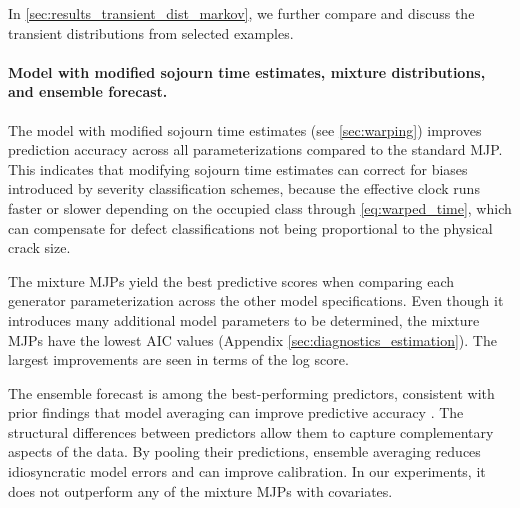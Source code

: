 In \cref{sec:results_transient_dist_markov}, we further compare and discuss the transient distributions from selected examples.



\paragraph{Model with modified sojourn time estimates, mixture distributions, and ensemble forecast.}
The model with modified sojourn time estimates (see \cref{sec:warping}) improves prediction accuracy across all parameterizations compared to the standard MJP. This indicates that modifying sojourn time estimates can correct for biases introduced by severity classification schemes, because the effective clock runs faster or slower depending on the occupied class through \cref{eq:warped_time}, which can compensate for defect classifications not being proportional to the physical crack size.

The mixture MJPs yield the best predictive scores when comparing each generator parameterization across the other model specifications. Even though it introduces many additional model parameters to be determined, the mixture MJPs have the lowest AIC values (Appendix \ref{sec:diagnostics_estimation}). The largest improvements are seen in terms of the log score.

The ensemble forecast is among the best-performing predictors, consistent with prior findings that model averaging can improve predictive accuracy \citep{wu2021a}. The structural differences between predictors allow them to capture complementary aspects of the data. By pooling their predictions, ensemble averaging reduces idiosyncratic model errors and can improve calibration. In our experiments, it does not outperform any of the mixture MJPs with covariates.


